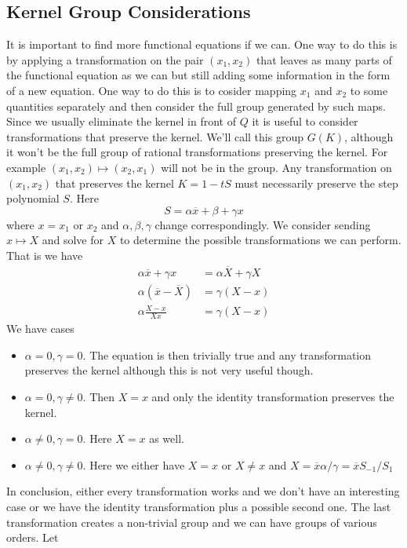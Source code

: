 \documentclass[12pt]{article}
\theoremstyle{definition} \newtheorem{definition}[theorem]{Definition}
\newcommand{\ol}[1]{\overline{#1}}
\begin{document}
\subsection{Kernel Group Considerations}
It is important to find more functional equations if we can. One way to do this is by applying a transformation on the pair $(x_1,x_2)$ that leaves as many parts of the functional equation as we can but still adding some information in the form of a new equation. One way to do this is to cosider mapping $x_1$ and $x_2$ to some quantities separately and then consider the full group generated by such maps. Since we usually eliminate the kernel in front of $Q$ it is useful to consider transformations that preserve the kernel.  We'll call this group $G(K)$, although it won't be the full group of rational transformations preserving the kernel. For example $(x_1,x_2) \mapsto (x_2,x_1)$ will not be in the group. Any transformation on $(x_1,x_2)$ that preserves the kernel $K = 1 -tS$ must necessarily preserve the step polynomial $S$. Here
\[
	S = \alpha \ol{x} + \beta + \gamma x
\]
where $x = x_1$ or $x_2$ and $\alpha,\beta,\gamma$ change correspondingly. We consider sending $x \mapsto X$ and solve for $X$ to determine the possible transformations we can perform. That is we have
\begin{align*}
	\alpha \ol{x} + \gamma x &=\alpha \ol{X} + \gamma X\\
	\alpha(\ol{x} - \ol{X}) &= \gamma (X-x)\\
	\alpha\frac{X-x}{Xx} &= \gamma (X-x)
\end{align*}
We have cases
\begin{itemize}
\item $\alpha = 0, \gamma = 0$. The equation is then trivially true and any transformation preserves the kernel although this is not very useful though.
\item $\alpha = 0, \gamma \neq 0$. Then $ X = x$ and only the identity transformation preserves the kernel.
\item $\alpha \neq 0, \gamma = 0$. Here $X = x$ as well.
\item $\alpha \neq 0, \gamma \neq 0$. Here we either have $X = x$ or $X\neq x$ and $X = \ol{x}\alpha/\gamma = \ol{x} S_{-1}/S_1$
\end{itemize}
In conclusion, either every transformation works and we don't have an interesting case or we have the identity transformation plus a possible second one. The last transformation creates a non-trivial group and we can have groups of various orders. Let
\end{document}

